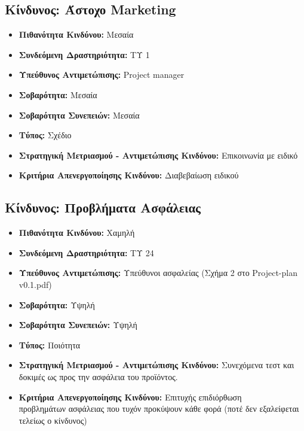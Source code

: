 \documentclass[12pt,a4paper]{article}
\begin{document}
\subsection{Κίνδυνος: Άστοχο Marketing}
\begin{itemize}
	\item \textbf{Πιθανότητα Κινδύνου:} Μεσαία
	\item \textbf{Συνδεόμενη Δραστηριότητα:} ΤΥ 1
	\item \textbf{Υπεύθυνος Αντιμετώπισης:} Project manager
	\item \textbf{Σοβαρότητα:} Μεσαία
	\item \textbf{Σοβαρότητα Συνεπειών:} Μεσαία
	\item \textbf{Τύπος:} Σχέδιο
	\item \textbf{Στρατηγική Μετριασμού - Αντιμετώπισης Κινδύνου:} Επικοινωνία με ειδικό
	\item \textbf{Κριτήρια Απενεργοποίησης Κινδύνου:} Διαβεβαίωση ειδικού
\end{itemize}

\subsection{Κίνδυνος: Προβλήματα Ασφάλειας}
\begin{itemize}
	\item \textbf{Πιθανότητα Κινδύνου:} Χαμηλή
	\item \textbf{Συνδεόμενη Δραστηριότητα:} ΤΥ 24
	\item \textbf{Υπεύθυνος Αντιμετώπισης:} Υπεύθυνοι ασφαλείας (Σχήμα 2 στο Project-plan v0.1.pdf)
	\item \textbf{Σοβαρότητα:} Υψηλή
	\item \textbf{Σοβαρότητα Συνεπειών:} Υψηλή
	\item \textbf{Τύπος:} Ποιότητα
	\item \textbf{Στρατηγική Μετριασμού - Αντιμετώπισης Κινδύνου:} Συνεχόμενα τεστ και δοκιμές ως προς την ασφάλεια του προϊόντος.
	\item \textbf{Κριτήρια Απενεργοποίησης Κινδύνου:} Επιτυχής επιδιόρθωση \\προβλημάτων ασφάλειας που τυχόν προκύψουν κάθε φορά (ποτέ δεν εξαλείφεται τελείως ο κίνδυνος)
\end{itemize}
\end{document}
